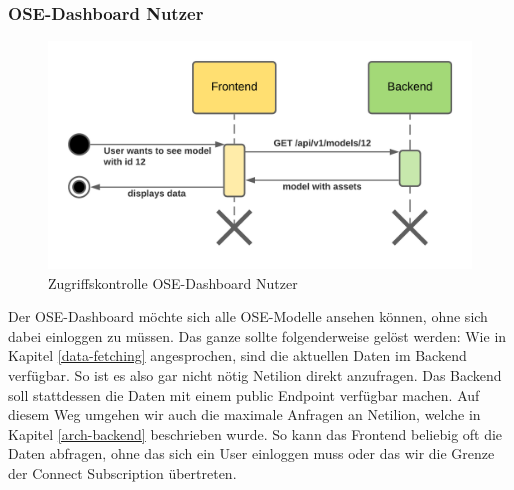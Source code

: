 \subsubsection{OSE-Dashboard Nutzer}
\begin{figure}[H]
  \centering
  \includegraphics[width=.6\linewidth]{./images/zugriffskontrolle2.png}
  \caption[{Sequenzdiagram, welches die Zugriffskontrolle für den OSE-Dashboard Nutzer beschreibt}]{Zugriffskontrolle OSE-Dashboard Nutzer}
  \label{fig:zugriffskontrolle2}
\end{figure}
Der OSE-Dashboard möchte sich alle OSE-Modelle ansehen können, ohne sich dabei einloggen zu müssen.
Das ganze sollte folgenderweise gelöst werden:
\newline
Wie in Kapitel \ref{data-fetching} angesprochen, sind die aktuellen Daten im Backend verfügbar. So ist es also gar nicht nötig Netilion direkt anzufragen. Das Backend soll stattdessen die Daten mit einem public Endpoint verfügbar machen. Auf diesem Weg umgehen wir auch die maximale Anfragen an Netilion, welche in Kapitel \ref{arch-backend} beschrieben wurde.
\newline
So kann das Frontend beliebig oft die Daten abfragen, ohne das sich ein User einloggen muss oder das wir die Grenze der Connect Subscription übertreten.